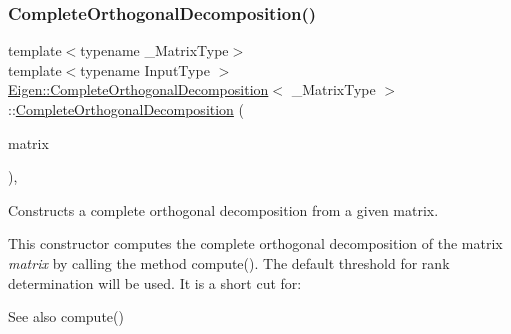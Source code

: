 \subsubsection{\texorpdfstring{CompleteOrthogonalDecomposition()}{CompleteOrthogonalDecomposition()}\hspace{0.1cm}{\footnotesize\ttfamily [3/4]}}
{\footnotesize\ttfamily template$<$typename \+\_\+\+Matrix\+Type$>$ \\
template$<$typename Input\+Type $>$ \\
\mbox{\hyperlink{class_eigen_1_1_complete_orthogonal_decomposition}{Eigen\+::\+Complete\+Orthogonal\+Decomposition}}$<$ \+\_\+\+Matrix\+Type $>$\+::\mbox{\hyperlink{class_eigen_1_1_complete_orthogonal_decomposition}{Complete\+Orthogonal\+Decomposition}} (\begin{DoxyParamCaption}\item[{const \mbox{\hyperlink{struct_eigen_1_1_eigen_base}{Eigen\+Base}}$<$ Input\+Type $>$ \&}]{matrix }\end{DoxyParamCaption})\hspace{0.3cm}{\ttfamily [inline]}, {\ttfamily [explicit]}}



Constructs a complete orthogonal decomposition from a given matrix. 

This constructor computes the complete orthogonal decomposition of the matrix {\itshape matrix} by calling the method compute(). The default threshold for rank determination will be used. It is a short cut for\+:


\begin{DoxyCode}{0}
\end{DoxyCode}


\begin{DoxySeeAlso}{See also}
compute() 
\end{DoxySeeAlso}
\mbox{\label{class_eigen_1_1_complete_orthogonal_decomposition_a082295ba2aac35a8b8b9e2d46e1d7ce4}} 
